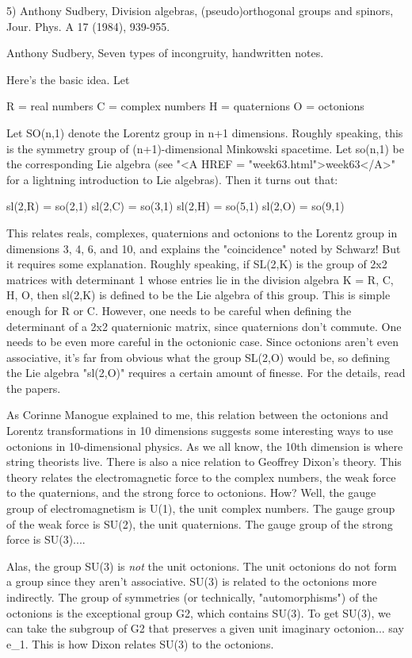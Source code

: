 5) Anthony Sudbery, Division algebras, (pseudo)orthogonal groups and
spinors, Jour. Phys. A 17 (1984), 939-955.  

Anthony Sudbery, Seven types of incongruity, handwritten notes.

Here's the basic idea.  Let 

R = real numbers
C = complex numbers
H = quaternions                         
O = octonions

Let SO(n,1) denote the Lorentz group in n+1 dimensions.  Roughly
speaking, this is the symmetry group of (n+1)-dimensional Minkowski
spacetime.  Let so(n,1) be the corresponding Lie algebra (see "<A HREF = "week63.html">week63</A>"
for a lightning introduction to Lie algebras).  Then it turns out that:

sl(2,R) = so(2,1)
sl(2,C) = so(3,1)
sl(2,H) = so(5,1)
sl(2,O) = so(9,1)

This relates reals, complexes, quaternions and octonions to the Lorentz
group in dimensions 3, 4, 6, and 10, and explains the "coincidence"
noted by Schwarz!  But it requires some explanation.  Roughly speaking,
if SL(2,K) is the group of 2x2 matrices with determinant 1 whose entries
lie in the division algebra K = R, C, H, O, then sl(2,K) is defined to
be the Lie algebra of this group.  This is simple enough for R or C.
However, one needs to be careful when defining the determinant of a 2x2
quaternionic matrix, since quaternions don't commute.  One needs to be
even more careful in the octonionic case.  Since octonions aren't even
associative, it's far from obvious what the group SL(2,O) would be, so
defining the Lie algebra "sl(2,O)" requires a certain amount of finesse.
For the details, read the papers.

As Corinne Manogue explained to me, this relation between the octonions
and Lorentz transformations in 10 dimensions suggests some interesting
ways to use octonions in 10-dimensional physics.  As we all know, the
10th dimension is where string theorists live.  There is also a nice
relation to Geoffrey Dixon's theory.  This theory relates the
electromagnetic force to the complex numbers, the weak force to the
quaternions, and the strong force to octonions.  How?  Well, the gauge
group of electromagnetism is U(1), the unit complex numbers.  The gauge
group of the weak force is SU(2), the unit quaternions.  The gauge group
of the strong force is SU(3)....

Alas, the group SU(3) is \emph{not} the unit octonions.  The unit
octonions do not form a group since they aren't associative.  SU(3) is
related to the octonions more indirectly.  The group of symmetries (or
technically, "automorphisms") of the octonions is the
exceptional group G2, which contains SU(3).  To get SU(3), we can take
the subgroup of G2 that preserves a given unit imaginary octonion... say
e_{1}.  This is how Dixon relates SU(3) to the octonions.

